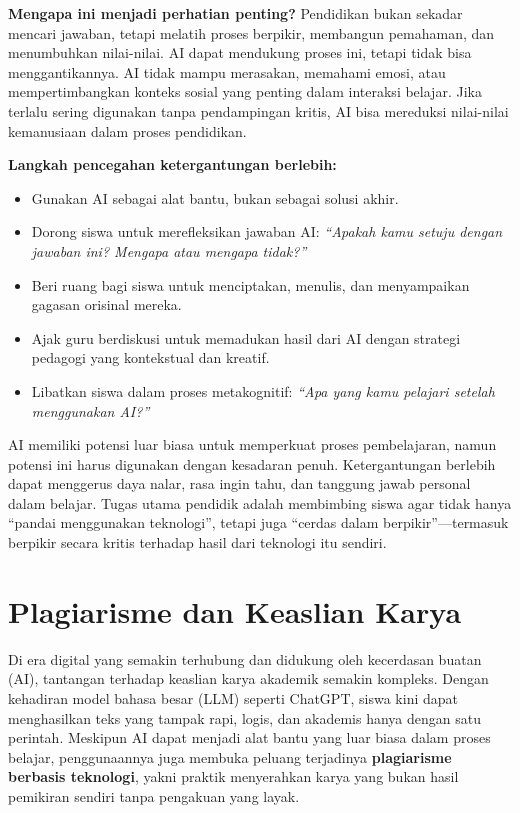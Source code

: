 \textbf{Mengapa ini menjadi perhatian penting?}  
Pendidikan bukan sekadar mencari jawaban, tetapi melatih proses berpikir, membangun pemahaman, dan menumbuhkan nilai-nilai. AI dapat mendukung proses ini, tetapi tidak bisa menggantikannya. AI tidak mampu merasakan, memahami emosi, atau mempertimbangkan konteks sosial yang penting dalam interaksi belajar. Jika terlalu sering digunakan tanpa pendampingan kritis, AI bisa mereduksi nilai-nilai kemanusiaan dalam proses pendidikan.

\textbf{Langkah pencegahan ketergantungan berlebih:}
\begin{itemize}
	\item Gunakan AI sebagai alat bantu, bukan sebagai solusi akhir.
	\item Dorong siswa untuk merefleksikan jawaban AI: \textit{“Apakah kamu setuju dengan jawaban ini? Mengapa atau mengapa tidak?”}
	\item Beri ruang bagi siswa untuk menciptakan, menulis, dan menyampaikan gagasan orisinal mereka.
	\item Ajak guru berdiskusi untuk memadukan hasil dari AI dengan strategi pedagogi yang kontekstual dan kreatif.
	\item Libatkan siswa dalam proses metakognitif: \textit{“Apa yang kamu pelajari setelah menggunakan AI?”}
\end{itemize}

AI memiliki potensi luar biasa untuk memperkuat proses pembelajaran, namun potensi ini harus digunakan dengan kesadaran penuh. Ketergantungan berlebih dapat menggerus daya nalar, rasa ingin tahu, dan tanggung jawab personal dalam belajar. Tugas utama pendidik adalah membimbing siswa agar tidak hanya “pandai menggunakan teknologi”, tetapi juga “cerdas dalam berpikir”—termasuk berpikir secara kritis terhadap hasil dari teknologi itu sendiri.

\section{Plagiarisme dan Keaslian Karya}

Di era digital yang semakin terhubung dan didukung oleh kecerdasan buatan (AI), tantangan terhadap keaslian karya akademik semakin kompleks. Dengan kehadiran model bahasa besar (LLM) seperti ChatGPT, siswa kini dapat menghasilkan teks yang tampak rapi, logis, dan akademis hanya dengan satu perintah. Meskipun AI dapat menjadi alat bantu yang luar biasa dalam proses belajar, penggunaannya juga membuka peluang terjadinya \textbf{plagiarisme berbasis teknologi}, yakni praktik menyerahkan karya yang bukan hasil pemikiran sendiri tanpa pengakuan yang layak.

